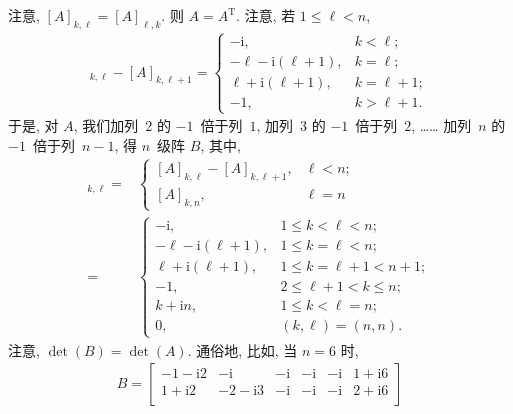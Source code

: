 \documentclass[../libro.tex]{subfiles}
\begin{document}
\begin{example}
    注意, \([A]_{k,\ell} = [A]_{\ell,k}\).
    则 \(A = A^{\mathrm{T}}\).
    注意, 若 \(1 \leq \ell < n\),
    \begin{align*}
        [A]_{k,\ell} - [A]_{k,\ell+1} =
        \begin{cases}
            -\mathrm{i},                   & k < \ell;     \\
            -\ell - \mathrm{i} (\ell + 1), & k = \ell;     \\
            \ell + \mathrm{i} (\ell + 1),  & k = \ell + 1; \\
            -1,                            & k > \ell + 1.
        \end{cases}
    \end{align*}
    于是, 对 \(A\), 我们加列~\(2\) 的 \(-1\)~倍于列~\(1\),
    加列~\(3\) 的 \(-1\)~倍于列~\(2\),
    ……
    加列~\(n\) 的 \(-1\)~倍于列~\(n-1\),
    得 \(n\)~级阵 \(B\),
    其中,
    \begin{align*}
        [B]_{k,\ell}
        = {} &
        \begin{cases}
            [A]_{k,\ell} - [A]_{k,\ell+1}, & \ell < n; \\
            [A]_{k,n},                     & \ell = n
        \end{cases}
        \\
        = {} &
        \begin{cases}
            -\mathrm{i},                   & 1 \leq k < \ell < n;         \\
            -\ell - \mathrm{i} (\ell + 1), & 1 \leq k = \ell < n;         \\
            \ell + \mathrm{i} (\ell + 1),  & 1 \leq k = \ell + 1 < n + 1; \\
            -1,                            & 2 \leq \ell + 1 < k \leq n;  \\
            k + \mathrm{i} n,              & 1 \leq k < \ell = n;         \\
            0,                             & (k, \ell) = (n, n).
        \end{cases}
    \end{align*}
    注意, \(\det {(B)} = \det {(A)}\).
    通俗地, 比如, 当 \(n = 6\) 时,
    \begin{align*}
        B =
        \begin{bmatrix}
            -1-\mathrm{i}2 & -\mathrm{i}    & -\mathrm{i}    & -\mathrm{i}    & -\mathrm{i}    & 1+\mathrm{i}6 \\
            1+\mathrm{i}2  & -2-\mathrm{i}3 & -\mathrm{i}    & -\mathrm{i}    & -\mathrm{i}    & 2+\mathrm{i}6 \\

\end{bmatrix}
\end{align*}
\end{example}
\end{document}
